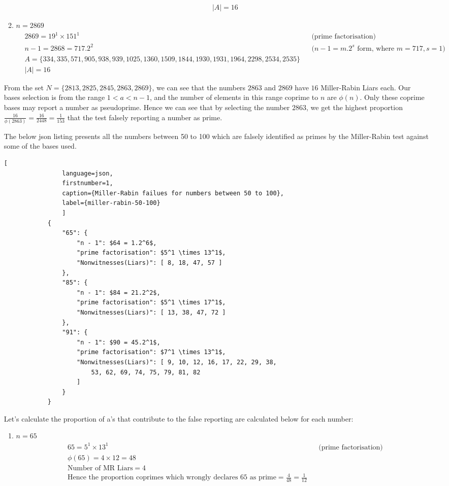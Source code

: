 \documentclass[11pt,a4paper]{article}
\begin{document}
\begin{enumerate}[1.]
\begin{flushleft}
\begin{enumerate}[1.]
\begin{align}
					& |A| = 16 \nonumber
				\end{align}
				\item $n = 2869$
				\begin{align}
					& 2869 = 19^1 \times 151^1 &&\text{(prime factorisation)}\nonumber\\
					& n - 1 = 2868 = 717.2^2 &&\text{($n - 1 = m.2^s$ form, where $m = 717, s = 1$)}\nonumber\\
					& A = \{334, 335, 571, 905, 938, 939, 1025, 1360, 1509, 1844, 1930, 1931, 1964, 2298, 2534, 2535\} \nonumber\\
					& |A| = 16 \nonumber
				\end{align}
			\end{enumerate}

			From the set $N = \{2813, 2825, 2845, 2863, 2869\}$, we can see that the numbers $2863$ and $2869$ have $16$ Miller-Rabin Liars each. Our bases selection is from the range $1 < a < n - 1$, and the number of elements in this range coprime to $n$ are $\phi(n)$. Only these coprime bases may report a number as pseudoprime.  Hence we can see that by selecting the number $2863$, we get the highest proportion $\frac{16}{\phi(2863)} = \frac{16}{2448} = \frac{1}{153}$ that the test falsely reporting a number as prime.

			\bigbreak
			The below json listing presents all the numbers between 50 to 100 which are falsely identified as primes by the Miller-Rabin test against some of the bases used.

			\begin{lstlisting}[
				language=json,
				firstnumber=1,
				caption={Miller-Rabin failues for numbers between 50 to 100},
				label={miller-rabin-50-100}
				]
			{
				"65": {
					"n - 1": $64 = 1.2^6$,
					"prime factorisation": $5^1 \times 13^1$,
					"Nonwitnesses(Liars)": [ 8, 18, 47, 57 ]
				},
				"85": {
					"n - 1": $84 = 21.2^2$,
					"prime factorisation": $5^1 \times 17^1$,
					"Nonwitnesses(Liars)": [ 13, 38, 47, 72 ]
				},
				"91": {
					"n - 1": $90 = 45.2^1$,
					"prime factorisation": $7^1 \times 13^1$,
					"Nonwitnesses(Liars)": [ 9, 10, 12, 16, 17, 22, 29, 38,
						53, 62, 69, 74, 75, 79, 81, 82
					]
				}
			}
			\end{lstlisting}

			Let's calculate the proportion of a's that contribute to the false reporting are calculated below for each number:

			\begin{enumerate}[1.]
				\item $n = 65$
				\begin{align}
					& 65 = 5^1 \times 13^1 &&\text{(prime factorisation)}\nonumber\\
					& \phi(65) = 4 \times 12 = 48 \nonumber\\
					& \text{Number of MR Liars} = 4\nonumber\\
					& \text{Hence the proportion coprimes which wrongly declares 65 as prime} = \frac{4}{48} = \frac{1}{12} \nonumber
				\end{align}


\end{enumerate}
\end{flushleft}
\end{enumerate}
\end{document}
